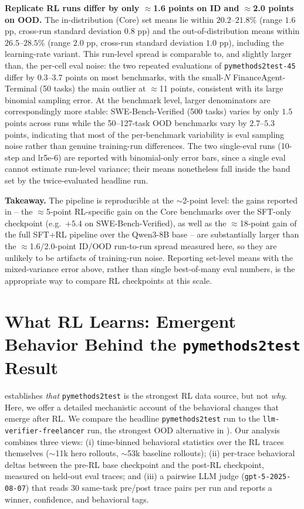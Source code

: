 \documentclass{llmxive}
\begin{document}


\textbf{Replicate RL runs differ by only $\approx$1.6 points on ID and $\approx$2.0 points on OOD.} The in-distribution (Core) set means lie within $20.2$--$21.8\%$ (range $1.6$ pp, cross-run standard deviation $0.8$ pp) and the out-of-distribution means within $26.5$--$28.5\%$ (range $2.0$ pp, cross-run standard deviation $1.0$ pp), including the learning-rate variant. This run-level spread is comparable to, and slightly larger than, the per-cell eval noise: the two repeated evaluations of \texttt{pymethods2test-45} differ by $0.3$--$3.7$ points on most benchmarks, with the small-$N$ FinanceAgent-Terminal (50 tasks) the main outlier at $\approx$11 points, consistent with its large binomial sampling error. At the benchmark level, larger denominators are correspondingly more stable: SWE-Bench-Verified (500 tasks) varies by only $1.5$ points across runs while the 50--127-task OOD benchmarks vary by $2.7$--$5.3$ points, indicating that most of the per-benchmark variability is eval sampling noise rather than genuine training-run differences. The two single-eval runs (10-step and lr5e-6) are reported with binomial-only error bars, since a single eval cannot estimate run-level variance; their means nonetheless fall inside the band set by the twice-evaluated headline run.

\textbf{Takeaway.} The pipeline is reproducible at the $\sim$2-point level: the gains reported in  -- the $\approx$5-point RL-specific gain on the Core benchmarks over the SFT-only checkpoint (e.g.\ $+5.4$ on SWE-Bench-Verified), as well as the $\approx$18-point gain of the full SFT+RL pipeline over the Qwen3-8B base -- are substantially larger than the $\approx$1.6/2.0-point ID/OOD run-to-run spread measured here, so they are unlikely to be artifacts of training-run noise. Reporting set-level means with the mixed-variance error above, rather than single best-of-many eval numbers, is the appropriate way to compare RL checkpoints at this scale.

\section{What RL Learns: Emergent Behavior Behind the \texttt{pymethods2test} Result}
\label{app:rl-behavior}

 establishes \emph{that} \texttt{pymethods2test} is the strongest RL data source, but not \emph{why}. Here, we offer a detailed mechanistic account of the behavioral changes that emerge after RL. We compare the headline \texttt{pymethods2test} run to the \texttt{llm-verifier-freelancer}  run, the strongest OOD alternative in ). Our analysis combines three views: (i) time-binned behavioral statistics over the RL traces themselves ($\sim$11k hero rollouts, $\sim$53k baseline rollouts); (ii) per-trace behavioral deltas between the pre-RL base checkpoint and the post-RL checkpoint, measured on held-out eval traces; and (iii) a pairwise LLM judge (\texttt{gpt-5-2025-08-07}) that reads $30$ same-task pre/post trace pairs per run and reports a winner, confidence, and behavioral tags.
\end{document}

